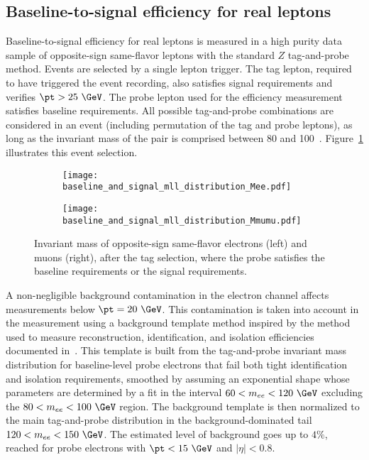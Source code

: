 \subsection*{Baseline-to-signal efficiency for real leptons}
\label{subsubsec:fakes_matrix_real_efficiency}


Baseline-to-signal efficiency for real leptons is measured in a high purity data sample of opposite-sign same-flavor leptons with the standard $Z$ tag-and-probe method.
Events are selected by a single lepton trigger.
The tag lepton, required to have triggered the event recording, also satisfies signal requirements and verifies $\pt>25~\GeV$. 
The probe lepton used for the efficiency measurement satisfies baseline requirements. 
All possible tag-and-probe combinations are considered in an event (including permutation of the tag and probe leptons), 
as long as the invariant mass of the pair is comprised between 80 and 100~\GeV. 
Figure~\ref{fig:RLE_mll_distribution} illustrates this event selection.

\begin{figure}[htb!]
\centering
\begin{subfigure}[b]{0.45\textwidth}
	\texttt{[image: baseline\_and\_signal\_mll\_distribution\_Mee.pdf]}
\end{subfigure}
\begin{subfigure}[b]{0.45\textwidth}
	\texttt{[image: baseline\_and\_signal\_mll\_distribution\_Mmumu.pdf]}
\end{subfigure}
\caption{Invariant mass of opposite-sign same-flavor electrons (left) and muons (right), after the tag selection, 
where the probe satisfies the baseline requirements or the signal requirements.}
\label{fig:RLE_mll_distribution}
\end{figure}

A non-negligible background contamination in the electron channel affects measurements below $\pt=20~\GeV$. 
This contamination is taken into account in the measurement using a background template method inspired by the method used to measure reconstruction, identification, and 
isolation efficiencies documented in~\cite{ATLAS-CONF-2014-032}. 
This template is built from the tag-and-probe invariant mass distribution for baseline-level probe electrons that fail both tight identification
 and isolation requirements, smoothed by assuming an exponential shape whose parameters are determined by a fit in the interval $60<m_{ee}<120~\GeV$ excluding the $80<m_{ee}< 100~\GeV$ region. 
The background template is then normalized to the main tag-and-probe distribution in the background-dominated tail $120<m_{ee}<150~\GeV$. 
The estimated level of background goes up to $4\%$, reached for probe electrons with $\pt<15~\GeV$ and $|\eta|<0.8$. 


